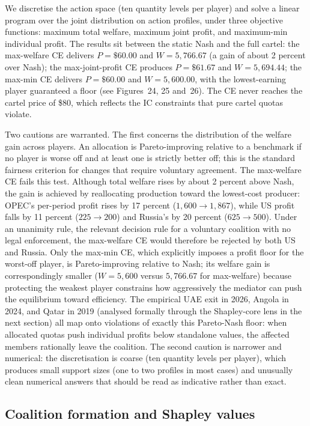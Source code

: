 We discretise the action space (ten quantity levels per player) and
solve a linear program over the joint distribution on action profiles,
under three objective functions: maximum total welfare, maximum joint
profit, and maximum-min individual profit. The results sit between the
static Nash and the full cartel: the max-welfare CE delivers
$P = \$60.00$ and $W = 5{,}766.67$ (a gain of about 2 percent over
Nash); the max-joint-profit CE produces $P = \$61.67$ and
$W = 5{,}694.44$; the max-min CE delivers $P = \$60.00$ and
$W = 5{,}600.00$, with the lowest-earning player guaranteed a floor
(see Figures~24, 25 and~26). The CE never reaches the cartel price of
\$80, which reflects the IC constraints that pure cartel quotas
violate.

Two cautions are warranted. The first concerns the distribution of the
welfare gain across players. An allocation is Pareto-improving relative
to a benchmark if no player is worse off and at least one is strictly
better off; this is the standard fairness criterion for changes that
require voluntary agreement. The max-welfare CE fails this test.
Although total welfare rises by about 2 percent above Nash, the gain is
achieved by reallocating production toward the lowest-cost producer:
OPEC's per-period profit rises by 17 percent ($1{,}600 \to 1{,}867$),
while US profit falls by 11 percent ($225 \to 200$) and Russia's by 20
percent ($625 \to 500$). Under an unanimity rule, the relevant decision
rule for a voluntary coalition with no legal enforcement, the
max-welfare CE would therefore be rejected by both US and Russia. Only
the max-min CE, which explicitly imposes a profit floor for the
worst-off player, is Pareto-improving relative to Nash; its welfare
gain is correspondingly smaller ($W = 5{,}600$ versus $5{,}766.67$ for
max-welfare) because protecting the weakest player constrains how
aggressively the mediator can push the equilibrium toward efficiency.
The empirical UAE exit in 2026, Angola in 2024, and Qatar in 2019
(analysed formally through the Shapley-core lens in the next section)
all map onto violations of exactly this Pareto-Nash floor: when
allocated quotas push individual profits below standalone values, the
affected members rationally leave the coalition. The second caution is
narrower and numerical: the discretisation is coarse (ten quantity
levels per player), which produces small support sizes (one to two
profiles in most cases) and unusually clean numerical answers that
should be read as indicative rather than exact.

\subsection{Coalition formation and Shapley values}
\label{subsec:shapley}

